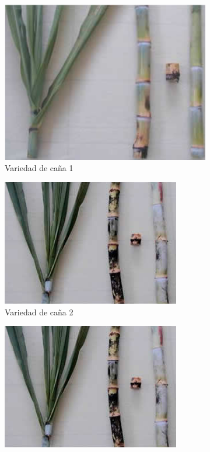 \documentclass{article}%
\begin{document}
\begin{figure}[h!]%
\begin{subfigure}{0.33\linewidth}%
\includegraphics[width=0.95\linewidth]{Cana/POJ2878.png}%
\caption{Variedad de caña 1}%
\end{subfigure}%
\begin{subfigure}{0.33\linewidth}%
\includegraphics[width=0.95\linewidth]{Cana/RD75-11.png}%
\caption{Variedad de caña 2}%
\end{subfigure}%
\begin{subfigure}{0.33\linewidth}%
\includegraphics[width=0.95\linewidth]{Cana/RD75-11.png}%

\end{subfigure}
\end{figure}
\end{document}
